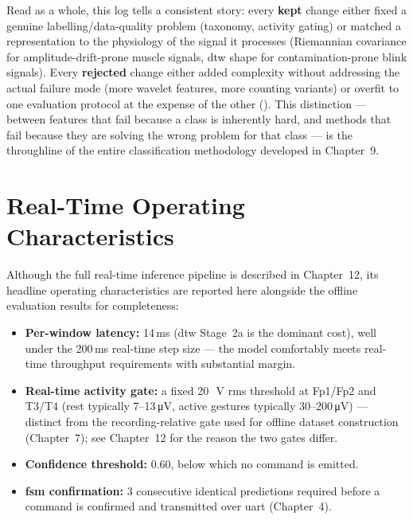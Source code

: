 Read as a whole, this log tells a consistent story: every
\textbf{kept} change either fixed a genuine labelling/data-quality
problem (taxonomy, activity gating) or matched a representation to
the physiology of the signal it processes (Riemannian covariance
for amplitude-drift-prone muscle signals, \acrshort{dtw} shape for
contamination-prone blink signals). Every \textbf{rejected} change
either added complexity without addressing the actual failure mode
(more wavelet features, more counting variants) or overfit to one
evaluation protocol at the expense of the other
(). This distinction --- between features that
fail because a class is inherently hard, and methods that fail
because they are solving the wrong problem for that class --- is
the throughline of the entire classification methodology developed
in Chapter~9.

\section{Real-Time Operating Characteristics}
\label{sec:res_realtime}

Although the full real-time inference pipeline is described in
Chapter~12, its headline operating characteristics are reported
here alongside the offline evaluation results for completeness:

\begin{itemize}[leftmargin=*]
    \item \textbf{Per-window latency:} 14\,ms (\acrshort{dtw}
    Stage~2a is the dominant cost), well under the 200\,ms
    real-time step size --- the model comfortably meets real-time
    throughput requirements with substantial margin.
    \item \textbf{Real-time activity gate:} a fixed 20\,\si{\micro
    \volt} \acrshort{rms} threshold at Fp1/Fp2 and T3/T4 (rest
    typically 7--13\,\si{\micro\volt}, active gestures typically
    30--200\,\si{\micro\volt}) --- distinct from the
    recording-relative gate used for offline dataset construction
    (Chapter~7); see Chapter~12 for the reason the two gates
    differ.
    \item \textbf{Confidence threshold:} 0.60, below which no
    command is emitted.
    \item \textbf{\acrshort{fsm} confirmation:} 3 consecutive
    identical predictions required before a command is confirmed
    and transmitted over \acrshort{uart} (Chapter~4).
\end{itemize}

